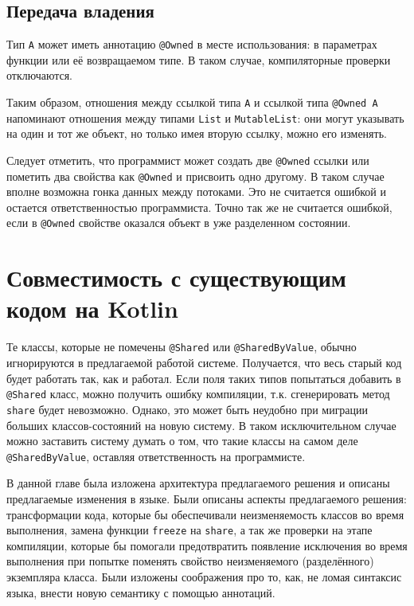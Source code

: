 \documentclass[specification,annotation,times]{itmo-student-thesis}
\begin{document}
\subsection{Передача владения}

Тип \texttt{А} может иметь аннотацию \texttt{@Owned} в месте использования: в параметрах функции или её возвращаемом типе. В таком случае, компиляторные проверки отключаются.

Таким образом, отношения между ссылкой типа \texttt{А} и ссылкой типа \texttt{@Owned A} напоминают отношения между типами \texttt{List} и \texttt{MutableList}: они могут указывать на один и тот же объект, но только имея вторую ссылку, можно его изменять.

Следует отметить, что программист может создать две \texttt{@Owned} ссылки или пометить два свойства как \texttt{@Owned} и присвоить одно другому. В таком случае вполне возможна гонка данных между потоками. Это не считается ошибкой и остается ответственностью программиста.
Точно так же не считается ошибкой, если в \texttt{@Owned} свойстве оказался объект в уже разделенном состоянии.

\section{Совместимость с существующим кодом на Kotlin}\label{backwards_compat}

Те классы, которые не помечены \texttt{@Shared} или \texttt{@SharedByValue}, обычно игнорируются в предлагаемой работой системе.
Получается, что весь старый код будет работать так, как и работал.
Если поля таких типов попытаться добавить в \texttt{@Shared} класс, можно получить ошибку компиляции, т.к. сгенерировать метод \texttt{share} будет невозможно.
Однако, это может быть неудобно при миграции больших классов-состояний на новую систему.
В таком исключительном случае можно заставить систему думать о том, что такие классы на самом деле \texttt{@SharedByValue}, оставляя ответственность на программисте.

\chapterconclusion

В данной главе была изложена архитектура предлагаемого решения и описаны предлагаемые изменения в языке.
Были описаны аспекты предлагаемого решения: трансформации кода, которые бы обеспечивали неизменяемость классов во время выполнения, замена функции \texttt{freeze} на \texttt{share}, а так же проверки на этапе компиляции, которые бы помогали предотвратить появление исключения во время выполнения при попытке поменять свойство неизменяемого (разделённого) экземпляра класса.
Были изложены соображения про то, как, не ломая синтаксис языка, внести новую семантику с помощью аннотаций.
\end{document}
